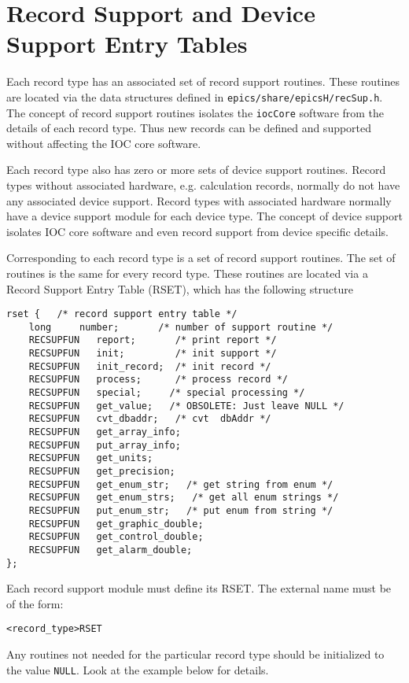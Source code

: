 \section{Record Support and Device Support Entry Tables}

Each record type has an associated set of record support routines. These routines are located via the data structures 
defined in \verb|epics/share/epicsH/recSup.h|. The concept of record support routines isolates the \verb|iocCore| software 
from the details of each record type. Thus new records can be defined and supported without affecting the IOC core 
software.

Each record type also has zero or more sets of device support routines. Record types without associated hardware, e.g. 
calculation records, normally do not have any associated device support. Record types with associated hardware normally 
have a  device support module for each device type. The concept of device support isolates IOC core software and even 
record support from device specific details.

Corresponding to each record type is a set of record support routines. The set of routines is the same for every record type. 
These routines are located via a Record Support Entry Table (RSET), which has the following structure

\begin{verbatim}
rset {   /* record support entry table */
    long     number;       /* number of support routine */
    RECSUPFUN   report;       /* print report */
    RECSUPFUN   init;         /* init support */
    RECSUPFUN   init_record;  /* init record */
    RECSUPFUN   process;      /* process record */
    RECSUPFUN   special;     /* special processing */
    RECSUPFUN   get_value;   /* OBSOLETE: Just leave NULL */
    RECSUPFUN   cvt_dbaddr;   /* cvt  dbAddr */
    RECSUPFUN   get_array_info;
    RECSUPFUN   put_array_info;
    RECSUPFUN   get_units;
    RECSUPFUN   get_precision;
    RECSUPFUN   get_enum_str;   /* get string from enum */
    RECSUPFUN   get_enum_strs;   /* get all enum strings */
    RECSUPFUN   put_enum_str;   /* put enum from string */
    RECSUPFUN   get_graphic_double;
    RECSUPFUN   get_control_double;
    RECSUPFUN   get_alarm_double;
};
\end{verbatim}Each record support module must define its RSET. The external name must be of the form:

\begin{verbatim}<record_type>RSET
\end{verbatim}Any routines not needed for the particular record type should be initialized to the value \verb|NULL|. Look at the example below 
for details.

